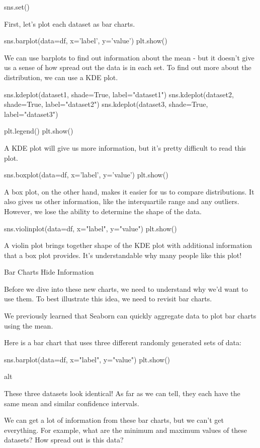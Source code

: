 \documentclass{journal}
\begin{document}
sns.set()

First, let's plot each dataset as bar charts.

sns.barplot(data=df, x='label', y='value')
plt.show()

We can use barplots to find out information about the mean - but it doesn't give us a sense of how spread out the data is in each set. To find out more about the distribution, we can use a KDE plot.

sns.kdeplot(dataset1, shade=True, label="dataset1")
sns.kdeplot(dataset2, shade=True, label="dataset2")
sns.kdeplot(dataset3, shade=True, label="dataset3")

plt.legend()
plt.show()

A KDE plot will give us more information, but it's pretty difficult to read this plot.

sns.boxplot(data=df, x='label', y='value')
plt.show()

A box plot, on the other hand, makes it easier for us to compare distributions. It also gives us other information, like the interquartile range and any outliers. However, we lose the ability to determine the shape of the data.

sns.violinplot(data=df, x="label", y="value")
plt.show()

A violin plot brings together shape of the KDE plot with additional information that a box plot provides. It's understandable why many people like this plot!



Bar Charts Hide Information

Before we dive into these new charts, we need to understand why we’d want to use them. To best illustrate this idea, we need to revisit bar charts.

We previously learned that Seaborn can quickly aggregate data to plot bar charts using the mean.

Here is a bar chart that uses three different randomly generated sets of data:

sns.barplot(data=df, x="label", y="value")
plt.show()

alt

These three datasets look identical! As far as we can tell, they each have the same mean and similar confidence intervals.

We can get a lot of information from these bar charts, but we can’t get everything. For example, what are the minimum and maximum values of these datasets? How spread out is this data?
\end{document}
